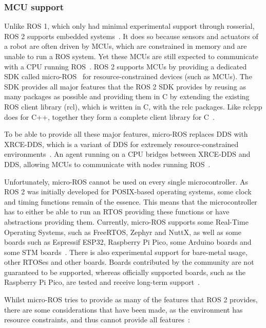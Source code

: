 \documentclass[a4paper]{book}
\begin{document}
\subsubsection{MCU support}
Unlike ROS 1, which only had minimal experimental support through rosserial, ROS
2 supports embedded systems~\cite{macenski2022robot}. It does so because sensors
and actuators of a robot are often driven by MCUs, which are constrained in
memory and are unable to run a ROS system. Yet these MCUs are still expected to
communicate with a CPU running ROS~\cite{macenski2022robot}. ROS 2 supports MCUs
by providing a dedicated SDK called micro-ROS~\cite{belsare2023microros} for
resource-constrained devices (such as MCUs). The SDK provides all major features
that the ROS 2 SDK provides by reusing as many packages as possible and
providing them in C by extending the existing ROS client library (rcl), which is
written in C, with the rclc packages. Like rclcpp does for C++, together they
form a complete client library for C~\cite{belsare2023microros}.
\par
To be able to provide all these major features, micro-ROS replaces DDS with
XRCE-DDS, which is a variant of DDS for extremely resource-constrained
environments~\cite{omg2020ddsxrce}. An agent running on a CPU bridges between
XRCE-DDS and DDS, allowing MCUs to communicate with nodes running
ROS~\cite{belsare2023microros}.
\par
Unfortunately, micro-ROS cannot be used on every single microcontroller. As ROS
2 was initially developed for POSIX-based operating systems, some clock and
timing functions remain of the essence. This means that the microcontroller has
to either be able to run an RTOS providing these functions or have abstractions
providing them. Currently, micro-ROS supports some Real-Time Operating Systems,
such as FreeRTOS, Zephyr and NuttX, as well as some boards such as Espressif
ESP32, Raspberry Pi Pico, some Arduino boards and some STM
boards~\cite{belsare2023microros}. There is also experimental support for
bare-metal usage, other RTOSes and other boards. Boards contributed by the
community are not guaranteed to be supported, whereas officially supported
boards, such as the Raspberry Pi Pico, are tested and receive long-term
support~\cite{microros_hardware}.
\par
Whilst micro-ROS tries to provide as many of the features that ROS 2 provides,
there are some considerations that have been made, as the environment has
resource constraints, and thus cannot provide all
features~\cite{belsare2023microros}:
\end{document}
